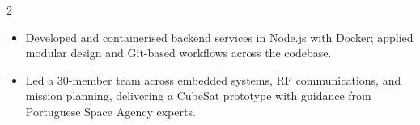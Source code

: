 \documentclass[10pt,a4paper,ragged2e,withhyper]{altacv}
\begin{document}
\begin{paracol}{2}
            \begin{itemize}
                \item Developed and containerised backend services in Node.js with Docker; applied modular design and Git-based workflows across the codebase.
            \end{itemize}

            \begin{itemize}
                \item Led a 30-member team across embedded systems, RF communications, and mission planning, delivering a CubeSat prototype with guidance from Portuguese Space Agency experts.
            \end{itemize}

    \end{paracol}
\end{document}
